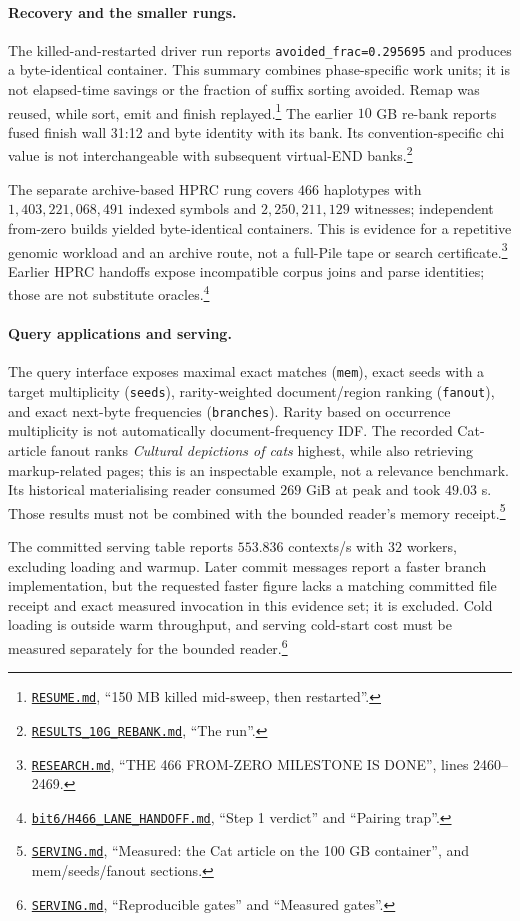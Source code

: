 \documentclass[10pt]{article}
\newcommand{\qnum}[2]{#2}
\newcommand{\ev}[2]{\footnote{\href{https://github.com/pangenome/sxgc/blob/c46a85217b9b269c91179cbebc396f96453181af/#1}{\nolinkurl{#1}}, #2.}}
\begin{document}
\paragraph{Recovery and the smaller rungs.}
The killed-and-restarted driver run reports \texttt{avoided\_frac=\qnum{avoided}{0.295695}} and
produces a byte-identical container. This summary combines phase-specific work units; it is not
elapsed-time savings or the fraction of suffix sorting avoided. Remap was reused, while sort, emit
and finish replayed.\ev{RESUME.md}{``150 MB killed mid-sweep, then restarted''} The earlier
$\qnum{ten}{10}$ GB re-bank reports fused finish wall \qnum{tenwall}{31:12} and byte identity with
its bank. Its convention-specific chi value is not interchangeable with subsequent virtual-END
banks.\ev{RESULTS_10G_REBANK.md}{``The run''}

The separate archive-based HPRC rung covers $\qnum{haps}{466}$ haplotypes with
$\qnum{hprcn}{1{,}403{,}221{,}068{,}491}$ indexed symbols and $\qnum{hprcchi}{2{,}250{,}211{,}129}$
witnesses; independent from-zero builds yielded byte-identical containers. This is evidence for a
repetitive genomic workload and an archive route, not a full-Pile tape or search
certificate.\ev{RESEARCH.md}{``THE 466 FROM-ZERO MILESTONE IS DONE'', lines 2460--2469} Earlier HPRC
handoffs expose incompatible corpus joins and parse identities; those are not substitute
oracles.\ev{bit6/H466_LANE_HANDOFF.md}{``Step 1 verdict'' and ``Pairing trap''}

\paragraph{Query applications and serving.}
The query interface exposes maximal exact matches (\texttt{mem}), exact seeds with a target
multiplicity (\texttt{seeds}), rarity-weighted document/region ranking (\texttt{fanout}), and exact
next-byte frequencies (\texttt{branches}). Rarity based on occurrence multiplicity is not
automatically document-frequency IDF. The recorded Cat-article fanout ranks \emph{Cultural
depictions of cats} highest, while also retrieving markup-related pages; this is an inspectable
example, not a relevance benchmark. Its historical materialising reader consumed
$\qnum{catrss}{269}$ GiB at peak and took $\qnum{catwall}{49.03}$ s. Those results must not be
combined with the bounded reader's memory receipt.\ev{SERVING.md}{``Measured: the Cat article on the
100 GB container'', and mem/seeds/fanout sections}

The committed serving table reports $\qnum{ctx}{553.836}$ contexts/s with $\qnum{workers}{32}$
workers, excluding loading and warmup. Later commit messages report a faster branch implementation,
but the requested faster figure lacks a matching committed file receipt and exact measured
invocation in this evidence set; it is excluded. Cold loading is outside warm throughput, and
serving cold-start cost must be measured separately for the bounded
reader.\ev{SERVING.md}{``Reproducible gates'' and ``Measured gates''}
\end{document}
